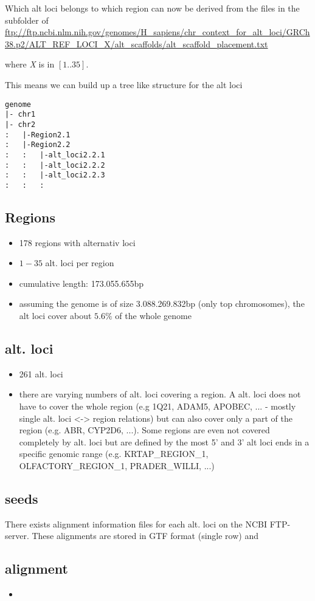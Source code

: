 \documentclass[10pt,a4paper]{article}
\begin{document}
Which alt loci belongs to which region can now be derived from the files in the
subfolder of  \\
\url{ftp://ftp.ncbi.nlm.nih.gov/genomes/H_sapiens/chr_context_for_alt_loci/GRCh38.p2/ALT_REF_LOCI_X/alt_scaffolds/alt_scaffold_placement.txt}

where \textit{X} is in $[1..35]$.

This means we can build up a tree like structure for the alt loci

\begin{verbatim}
genome
|- chr1
|- chr2
:   |-Region2.1
:   |-Region2.2
:   :   |-alt_loci2.2.1
:   :   |-alt_loci2.2.2
:   :   |-alt_loci2.2.3
:   :   :
\end{verbatim}


\subsection*{Regions}

\begin{itemize}
\item 178 regions with alternativ loci
\item $1 - 35$ alt. loci per region
\item cumulative length: 173.055.655bp
\item assuming the genome is of size 3.088.269.832bp (only top chromosomes), the alt loci cover about $5.6\%$ of the whole genome
\end{itemize}

\subsection*{alt. loci}

\begin{itemize}
\item 261 alt. loci
\item there are varying numbers of alt. loci covering a region. A alt. loci does not have to cover the whole region (e.g 1Q21, ADAM5, APOBEC, ... - mostly single alt. loci <-> region relations) but can also cover only a part of the region (e.g. ABR, CYP2D6, ...). Some regions are even not covered completely by alt. loci but are defined by the most 5' and 3' alt loci ends in a specific genomic range (e.g. KRTAP_REGION_1, OLFACTORY_REGION_1, PRADER_WILLI, ...)
\end{itemize}

\subsection*{seeds}

There exists alignment information files for each alt. loci on the NCBI FTP-server. These alignments are stored in GTF format (single row) and 

\subsection*{alignment}

\begin{itemize}
\item 
\end{itemize}
\end{document}
